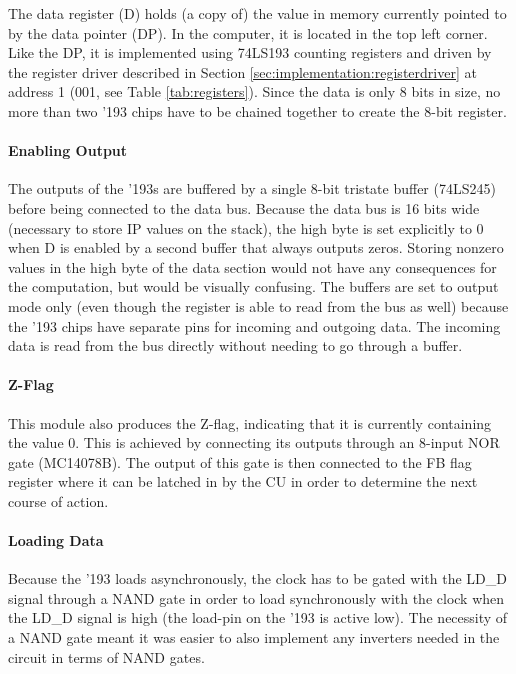 The data register (D) holds (a copy of) the value in memory currently pointed to by the data pointer (DP). In the computer, it is located in the top left corner. Like the DP, it is implemented using 74LS193 counting registers and driven by the register driver described in Section \ref{sec:implementation:registerdriver} at address 1 (001, see Table \ref{tab:registers}). Since the data is only 8 bits in size, no more than two '193 chips have to be chained together to create the 8-bit register.

\paragraph{Enabling Output} The outputs of the '193s are buffered by a single 8-bit tristate buffer (74LS245) before being connected to the data bus. Because the data bus is 16 bits wide (necessary to store IP values on the stack), the high byte is set explicitly to 0 when D is enabled by a second buffer that always outputs zeros. Storing nonzero values in the high byte of the data section would not have any consequences for the computation, but would be visually confusing. The buffers are set to output mode only (even though the register is able to read from the bus as well) because the '193 chips have separate pins for incoming and outgoing data. The incoming data is read from the bus directly without needing to go through a buffer.

\paragraph{Z-Flag} This module also produces the Z-flag, indicating that it is currently containing the value 0. This is achieved by connecting its outputs through an 8-input NOR gate (MC14078B). The output of this gate is then connected to the FB flag register where it can be latched in by the CU in order to determine the next course of action.

\paragraph{Loading Data} Because the '193 loads asynchronously, the clock has to be gated with the LD\_D signal through a NAND gate in order to load synchronously with the clock when the LD\_D signal is high (the load-pin on the '193 is active low). The necessity of a NAND gate meant it was easier to also implement any inverters needed in the circuit in terms of NAND gates.


